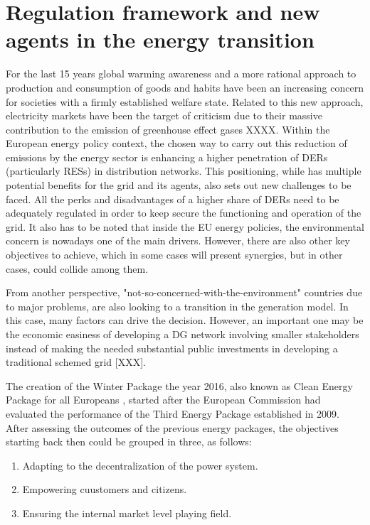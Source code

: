 \section{Regulation framework and new agents in the energy transition}
For the last 15 years global warming awareness and a more rational approach to production and consumption of goods and habits have been an increasing concern for societies with a firmly established welfare state. Related to this new approach, electricity markets have been the target of criticism due to their massive contribution to the emission of greenhouse effect gases XXXX. Within the European energy policy context, the chosen way to carry out this reduction of emissions by the energy sector is enhancing a higher penetration of DERs (particularly RESs) in distribution networks. This positioning, while has multiple potential benefits for the grid and its agents, also sets out new challenges to be faced.
All the perks and disadvantages of a higher share of DERs need to be adequately regulated in order to keep secure the functioning and operation of the grid. It also has to be noted that inside the EU energy policies, the environmental concern is nowadays
one of the main drivers. However, there are also other key objectives to achieve, which in some cases will present synergies, but in other cases, could collide among them. 

From another perspective, "not-so-concerned-with-the-environment" countries due to major problems, are also looking to a transition in the generation model. In this case, many factors can drive the decision. However, an important one may be the economic easiness of developing a DG network involving smaller stakeholders instead of making the needed substantial public investments in developing a traditional schemed grid [XXX].

The creation of the Winter Package the year 2016, also known as Clean Energy Package for all Europeans \cite{validzic2017clean}, started after the European Commission had evaluated the performance of the Third Energy Package established in 2009.  After assessing the outcomes of the previous energy packages, the objectives starting back then could be grouped in three, as follows: 
\begin{enumerate}
\item Adapting to the decentralization of the power system. 
\item Empowering cuustomers and citizens. 
\item Ensuring the internal market level playing field. 
\end{enumerate}

